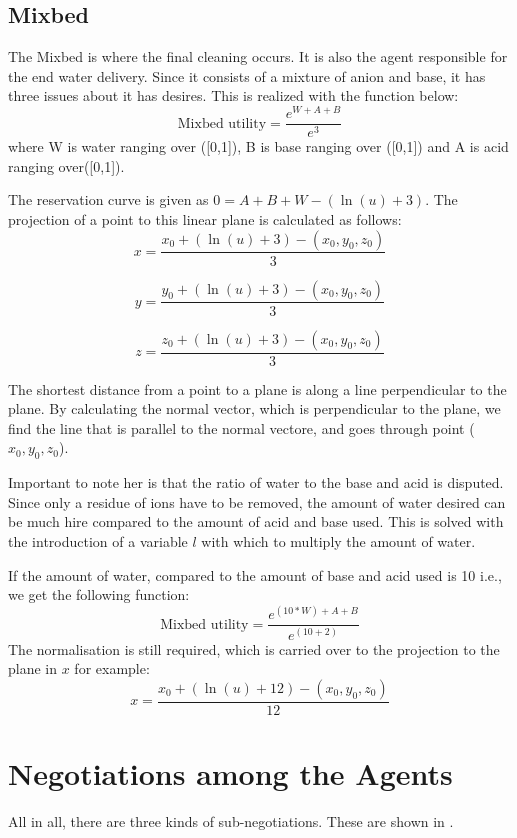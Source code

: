 \subsection{Mixbed}

The Mixbed is where the final cleaning occurs. It is also the agent responsible for the end water delivery. Since it consists of a mixture of anion and base, it has three issues about it has desires. This is realized with the function below:
\[
\text{Mixbed utility} = \frac{e^{W+A+B}}{e^3}
\] 
where W is water ranging over ([0,1]), B is base ranging over ([0,1]) and A is acid ranging over([0,1]).

The reservation curve is given as $0 = A+B+W - (\ln(u)+3)  $. The projection of a point to this linear plane is calculated as follows:
\[
x = \frac{x_0 + (\ln(u)+3) - (x_0, y_0, z_0)}{3}
\]

\[
y = \frac{y_0 + (\ln(u)+3) - (x_0, y_0, z_0)}{3} 
\]

\[
z = \frac{z_0 + (\ln(u)+3) - (x_0, y_0, z_0)}{3}
\]

The shortest distance from a point to a plane is along a line perpendicular to the plane. By calculating the normal vector, which is perpendicular to the plane, we find the line that is parallel to the normal vectore, and goes through point ($x_0, y_0, z_0$). 

Important to note her is that the ratio of water to the base and acid is disputed. Since only a residue of ions have to be removed, the amount of water desired can be much hire compared to the amount of acid and base used. This is solved with the introduction of a variable $l$ with which to multiply the amount of water. 

If the amount of water, compared to the amount of base and acid used is 10 i.e., we get the following function:
 \[
 \text{Mixbed utility} = \frac{e^{(10*W)+A+B}}{e^(10+2)}
 \] 
The normalisation is still required, which is carried over to the projection to the plane in $x$ for example:
\[
x = \frac{x_0 + (\ln(u)+12) - (x_0, y_0, z_0)}{12}
\]
\section{Negotiations among the Agents}
All in all, there are three kinds of sub-negotiations. These are shown in .

